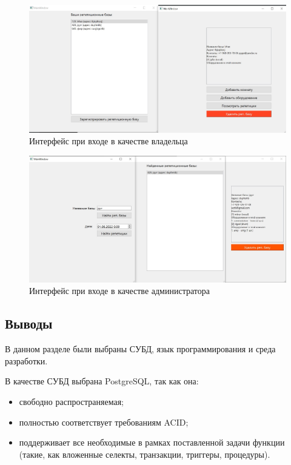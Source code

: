 \begin{figure}[h!]
	\begin{center}
		\includegraphics[scale=0.3]{jpg/Owner.jpg}
	\end{center}
	\captionsetup{justification=centering}
	\caption{Интерфейс при входе в качестве владельца}
\end{figure}

\begin{figure}[h!]
	\begin{center}
		\includegraphics[scale=0.3]{jpg/Admin.jpg}
	\end{center}
	\captionsetup{justification=centering}
	\caption{Интерфейс при входе в качестве администратора}
\end{figure}

\newpage

\subsection*{Выводы}

В данном разделе были выбраны СУБД, язык программирования и среда разработки.

В качестве СУБД выбрана PostgreSQL, так как она:
\begin{itemize}
	\item свободно распространяемая;
	\item полностью соответствует требованиям ACID;
	\item поддерживает все необходимые в рамках поставленной задачи функции (такие, как вложенные селекты, транзакции, триггеры, процедуры).
\end{itemize}

